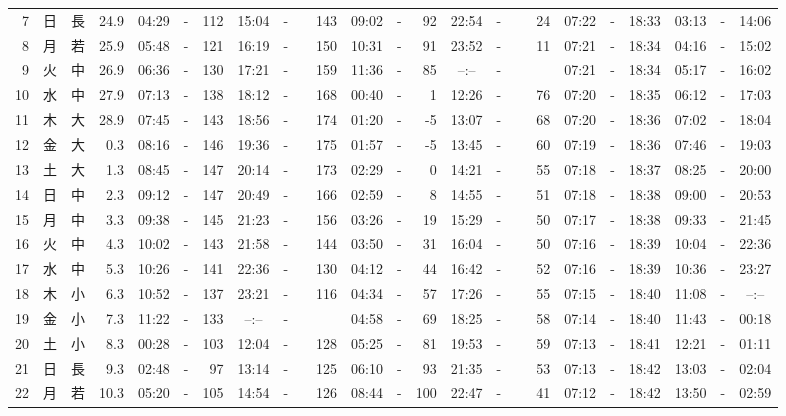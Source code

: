 \documentclass[12pt,a4j]{jsarticle}
\begin{document}
\begin{table}[htbp]
\begin{center}
{\begin{tabular}{|rc|cr|ccrccr|ccrccr|ccc|ccc|}
 7 & 日 & 長 & 24.9 &  04:29 &-& 112 &  15:04 &-& 143 &  09:02 &-&  92 &  22:54 &-&  24 & 07:22 & -& 18:33 & 03:13 & -& 14:06 \\
 8 & 月 & 若 & 25.9 &  05:48 &-& 121 &  16:19 &-& 150 &  10:31 &-&  91 &  23:52 &-&  11 & 07:21 & -& 18:34 & 04:16 & -& 15:02 \\
 9 & 火 & 中 & 26.9 &  06:36 &-& 130 &  17:21 &-& 159 &  11:36 &-&  85 &  --:-- &-&~~~~~ & 07:21 & -& 18:34 & 05:17 & -& 16:02 \\
10 & 水 & 中 & 27.9 &  07:13 &-& 138 &  18:12 &-& 168 &  00:40 &-&   1 &  12:26 &-&  76 & 07:20 & -& 18:35 & 06:12 & -& 17:03 \\
11 & 木 & 大 & 28.9 &  07:45 &-& 143 &  18:56 &-& 174 &  01:20 &-&  -5 &  13:07 &-&  68 & 07:20 & -& 18:36 & 07:02 & -& 18:04 \\
12 & 金 & 大 &  0.3 &  08:16 &-& 146 &  19:36 &-& 175 &  01:57 &-&  -5 &  13:45 &-&  60 & 07:19 & -& 18:36 & 07:46 & -& 19:03 \\
13 & 土 & 大 &  1.3 &  08:45 &-& 147 &  20:14 &-& 173 &  02:29 &-&   0 &  14:21 &-&  55 & 07:18 & -& 18:37 & 08:25 & -& 20:00 \\
14 & 日 & 中 &  2.3 &  09:12 &-& 147 &  20:49 &-& 166 &  02:59 &-&   8 &  14:55 &-&  51 & 07:18 & -& 18:38 & 09:00 & -& 20:53 \\
15 & 月 & 中 &  3.3 &  09:38 &-& 145 &  21:23 &-& 156 &  03:26 &-&  19 &  15:29 &-&  50 & 07:17 & -& 18:38 & 09:33 & -& 21:45 \\
16 & 火 & 中 &  4.3 &  10:02 &-& 143 &  21:58 &-& 144 &  03:50 &-&  31 &  16:04 &-&  50 & 07:16 & -& 18:39 & 10:04 & -& 22:36 \\
17 & 水 & 中 &  5.3 &  10:26 &-& 141 &  22:36 &-& 130 &  04:12 &-&  44 &  16:42 &-&  52 & 07:16 & -& 18:39 & 10:36 & -& 23:27 \\
18 & 木 & 小 &  6.3 &  10:52 &-& 137 &  23:21 &-& 116 &  04:34 &-&  57 &  17:26 &-&  55 & 07:15 & -& 18:40 & 11:08 & -& --:-- \\
19 & 金 & 小 &  7.3 &  11:22 &-& 133 &  --:-- &-&~~~~~ &  04:58 &-&  69 &  18:25 &-&  58 & 07:14 & -& 18:40 & 11:43 & -& 00:18 \\
20 & 土 & 小 &  8.3 &  00:28 &-& 103 &  12:04 &-& 128 &  05:25 &-&  81 &  19:53 &-&  59 & 07:13 & -& 18:41 & 12:21 & -& 01:11 \\
21 & 日 & 長 &  9.3 &  02:48 &-&  97 &  13:14 &-& 125 &  06:10 &-&  93 &  21:35 &-&  53 & 07:13 & -& 18:42 & 13:03 & -& 02:04 \\
22 & 月 & 若 & 10.3 &  05:20 &-& 105 &  14:54 &-& 126 &  08:44 &-& 100 &  22:47 &-&  41 & 07:12 & -& 18:42 & 13:50 & -& 02:59 \\

\end{tabular}}
\end{center}
\end{table}
\end{document}
